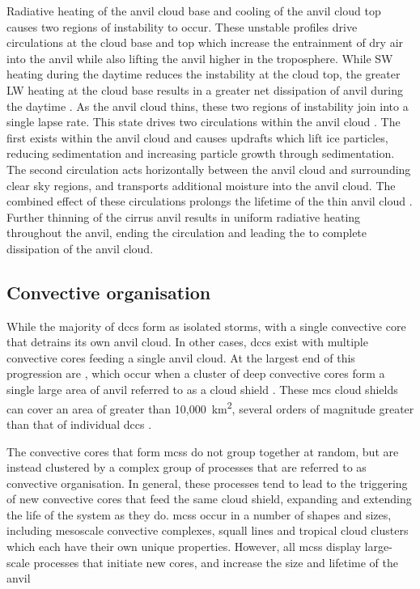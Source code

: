 Radiative heating of the anvil cloud base and cooling of the anvil cloud top causes two regions of instability to occur. 
These unstable profiles drive circulations at the cloud base and top which increase the entrainment of dry air into the anvil while also lifting the anvil higher in the troposphere. 
While SW heating during the daytime reduces the instability at the cloud top, the greater LW heating at the cloud base results in a greater net dissipation of anvil during the daytime \citep{sokol_tropical_2020}. 
As the anvil cloud thins, these two regions of instability join into a single lapse rate. 
This state drives two circulations within the anvil cloud \citep{gasparini_opinion_2023}. 
The first exists within the anvil cloud and causes updrafts which lift ice particles, reducing sedimentation and increasing particle growth through sedimentation. 
The second circulation acts horizontally between the anvil cloud and surrounding clear sky regions, and transports additional moisture into the anvil cloud. 
The combined effect of these circulations prolongs the lifetime of the thin anvil cloud \citep{sokol_tropical_2020}. 
Further thinning of the cirrus anvil results in uniform radiative heating throughout the anvil, ending the circulation and leading the to complete dissipation of the anvil cloud. 


\subsection{Convective organisation}

While the majority of \acrshort{dcc}s form as isolated storms, with a single convective core that detrains its own anvil cloud.
In other cases, \acrshort{dcc}s exist with multiple convective cores feeding a single anvil cloud.
At the largest end of this progression are , which occur when a cluster of deep convective cores form a single large area of anvil referred to as a cloud shield \citep{roca_simple_2017}.
These \acrshort{mcs} cloud shields can cover an area of greater than 10,000~km\textsuperscript{2}, several orders of magnitude greater than that of individual \acrshort{dcc}s \citep{houze_mesoscale_2004}.

The convective cores that form \acrshort{mcs}s do not group together at random, but are instead clustered by a complex group of processes that are referred to as convective organisation.
In general, these processes tend to lead to the triggering of new convective cores that feed the same cloud shield, expanding and extending the life of the system as they do.
\acrshort{mcs}s occur in a number of shapes and sizes, including mesoscale convective complexes, squall lines and tropical cloud clusters \citep{tsakraklides_global_2003a} which each have their own unique properties.
However, all \acrshort{mcs}s display large-scale processes that initiate new cores, and increase the size and lifetime of the anvil

